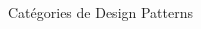 \documentclass[aspectratio=169]{beamer}
\begin{document}
\begin{frame}{Catégories de Design Patterns}
\begin{columns}
\begin{column}{0.5\textwidth}
{            }
        \end{column}
    \end{columns}
\end{frame}
\end{document}
